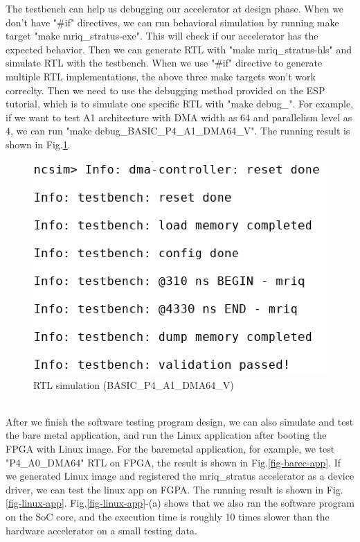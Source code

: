 \documentclass{sig-alternate}
\begin{document}
The testbench can help us debugging our accelerator at design phase. When we don't have "\#if" directives, we can run behavioral simulation by running make target "make mriq\_stratus-exe". This will check if our accelerator has the expected behavior. Then we can generate RTL with "make mriq\_stratus-hls" and simulate RTL with the testbench. When we use "\#if" directive to generate multiple RTL implementations, the above three make targets won't work correclty. Then we need to use the debugging method provided on the ESP tutorial, which is to simulate one specific RTL with "make debug\_<RTL name>". For example, if we want to test A1 architecture with DMA width as 64 and parallelism level as 4, we can run "make debug\_BASIC\_P4\_A1\_DMA64\_V". The running result is shown in Fig.\ref{fig-3}. 
\\
\begin{figure}[ht]
\centering
\captionsetup{justification=centering, format=hang}
\includegraphics[width=0.75\columnwidth]{figure/reverted-debug-sim-A1-4-4-2-2.png}
\caption{RTL simulation (BASIC\_P4\_A1\_DMA64\_V)}
\label{fig-3}
\end{figure}
\\
After we finish the software testing program design, we can also simulate and test the bare metal application, and run the Linux application after booting the FPGA with Linux image. For the baremetal application, for example, we test "P4\_A0\_DMA64" RTL on FPGA, the result is shown in Fig.\ref{fig-barec-app}. If we generated Linux image and registered the mriq\_stratus accelerator as a device driver, we can test the linux app on FGPA. The running result is shown in Fig.\ref{fig-linux-app}. Fig.\ref{fig-linux-app}-(a) shows that we also ran the software program on the SoC core, and the execution time is roughly 10 times slower than the hardware accelerator on a small testing data.
\end{document}
